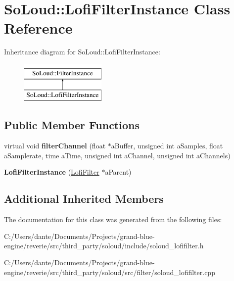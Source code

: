 \hypertarget{class_so_loud_1_1_lofi_filter_instance}{}\section{So\+Loud\+::Lofi\+Filter\+Instance Class Reference}
\label{class_so_loud_1_1_lofi_filter_instance}
Inheritance diagram for So\+Loud\+::Lofi\+Filter\+Instance\+:\begin{figure}[H]
\begin{center}
\leavevmode
\includegraphics[height=2.000000cm]{class_so_loud_1_1_lofi_filter_instance}
\end{center}
\end{figure}
\subsection*{Public Member Functions}
\begin{DoxyCompactItemize}
\item 
\mbox{\label{class_so_loud_1_1_lofi_filter_instance_aaf5e59fbe654f35c1652e77bf20091c2}} 
virtual void {\bfseries filter\+Channel} (float $\ast$a\+Buffer, unsigned int a\+Samples, float a\+Samplerate, time a\+Time, unsigned int a\+Channel, unsigned int a\+Channels)
\item 
\mbox{\label{class_so_loud_1_1_lofi_filter_instance_afc69d044de0a65c130feca0c1001fa91}} 
{\bfseries Lofi\+Filter\+Instance} (\mbox{\hyperlink{class_so_loud_1_1_lofi_filter}{Lofi\+Filter}} $\ast$a\+Parent)
\end{DoxyCompactItemize}
\subsection*{Additional Inherited Members}


The documentation for this class was generated from the following files\+:\begin{DoxyCompactItemize}
\item 
C\+:/\+Users/dante/\+Documents/\+Projects/grand-\/blue-\/engine/reverie/src/third\+\_\+party/soloud/include/soloud\+\_\+lofifilter.\+h\item 
C\+:/\+Users/dante/\+Documents/\+Projects/grand-\/blue-\/engine/reverie/src/third\+\_\+party/soloud/src/filter/soloud\+\_\+lofifilter.\+cpp\end{DoxyCompactItemize}
